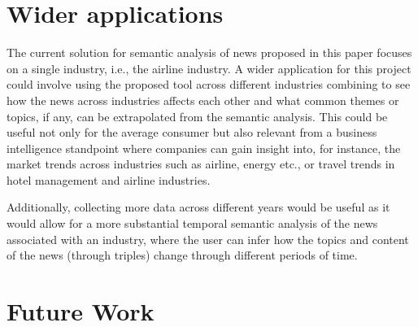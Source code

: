 

\section{Wider applications}
The current solution for semantic analysis of news proposed in this paper focuses on a single industry, i.e., the airline industry. A wider application for this project could involve using the proposed tool across different industries combining to see how the news across industries affects each other and what common themes or topics, if any, can be extrapolated from the semantic analysis. This could be useful not only for the average consumer but also relevant from a business intelligence standpoint where companies can gain insight into, for instance, the market trends across industries such as airline, energy etc., or travel trends in hotel management and airline industries.

Additionally, collecting more data across different years would be useful as it would allow for a more substantial temporal semantic analysis of the news associated with an industry, where the user can infer how the topics and content of the news (through triples) change through different periods of time.

\section{Future Work}

